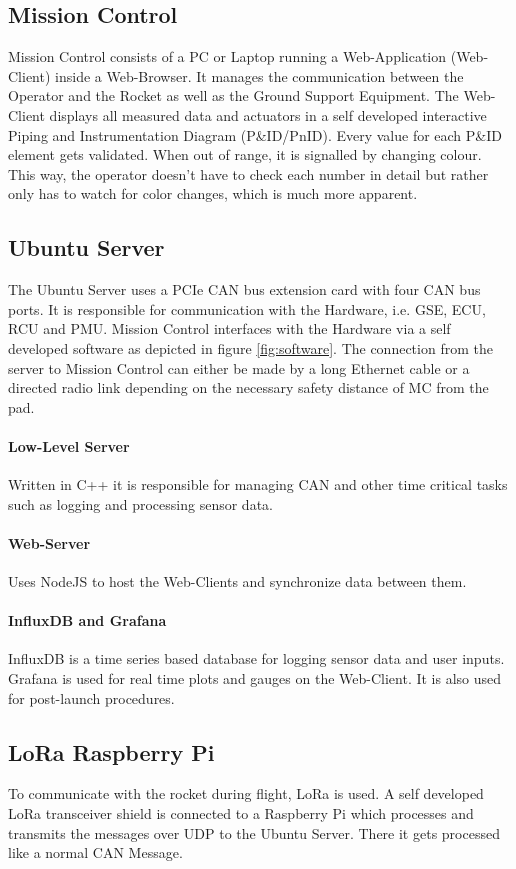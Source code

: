 \subsection{Mission Control} %
Mission Control consists of a PC or Laptop running a Web-Application (Web-Client) inside a Web-Browser. It manages the communication between the Operator and the Rocket as well as the Ground Support Equipment. The Web-Client displays all measured data and actuators in a self developed interactive Piping and Instrumentation Diagram (P\&ID/PnID). 
Every value for each P\&ID element gets validated. When out of range, it is
signalled by changing colour. This way, the operator doesn't have to check
each number in detail but rather only has to watch for color changes, which is much
more apparent.

\subsection{Ubuntu Server}

The Ubuntu Server uses a PCIe CAN bus extension card with four CAN bus ports.
It is responsible for communication with the Hardware, i.e. GSE, ECU, RCU and PMU.
Mission Control interfaces with the Hardware via a self developed software as 
depicted in figure \ref{fig:software}. The connection from the server to Mission Control can either be made by a long Ethernet cable or a directed radio link depending on the necessary safety distance of MC from the pad. 

\paragraph{Low-Level Server}

Written in C++ it is responsible for managing CAN and other time critical tasks such as logging and processing sensor data.

\paragraph{Web-Server}

Uses NodeJS to host the Web-Clients and synchronize data between them.

\paragraph{InfluxDB and Grafana}

InfluxDB is a time series based database for logging sensor data and user inputs. Grafana is used for real time plots and gauges on the Web-Client. It is also used for
post-launch procedures.

\subsection{LoRa Raspberry Pi}

To communicate with the rocket during flight, LoRa is used. A self developed
LoRa transceiver shield is connected to a Raspberry Pi which processes and 
transmits the messages over UDP to the Ubuntu Server. There it gets processed
like a normal CAN Message.

